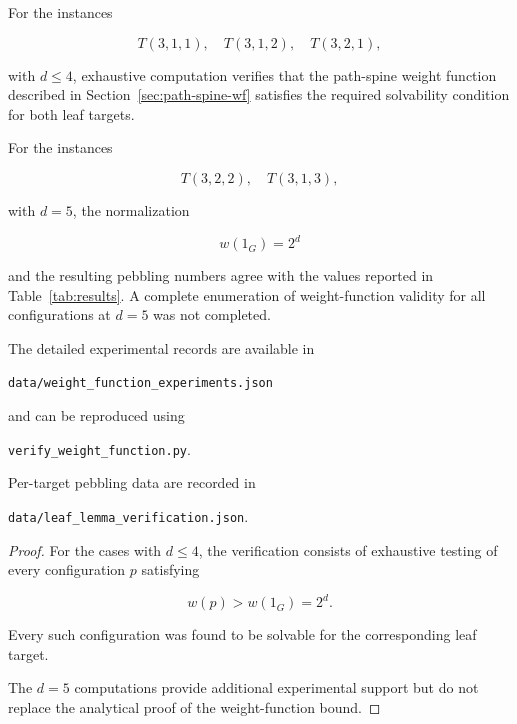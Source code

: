 \begin{proposition}
\label{prop:wf-computational}


For the instances

\[
T(3,1,1),\quad T(3,1,2),\quad T(3,2,1),
\]

with $d\le4$, exhaustive computation verifies that the path-spine weight
function described in Section~\ref{sec:path-spine-wf} satisfies the required
solvability condition for both leaf targets.

For the instances

\[
T(3,2,2),\quad T(3,1,3),
\]

with $d=5$, the normalization

\[
w(1_G)=2^d
\]

and the resulting pebbling numbers agree with the values reported in
Table~\ref{tab:results}. A complete enumeration of weight-function validity
for all configurations at $d=5$ was not completed.

The detailed experimental records are available in

\texttt{data/weight\_function\_experiments.json}

and can be reproduced using

\texttt{verify\_weight\_function.py}.

Per-target pebbling data are recorded in

\texttt{data/leaf\_lemma\_verification.json}.

\end{proposition}



\begin{proof}

For the cases with $d\le4$, the verification consists of exhaustive testing
of every configuration $p$ satisfying

\[
w(p)>w(1_G)=2^d .
\]

Every such configuration was found to be solvable for the corresponding leaf
target.

The $d=5$ computations provide additional experimental support but do not
replace the analytical proof of the weight-function bound.

\end{proof}